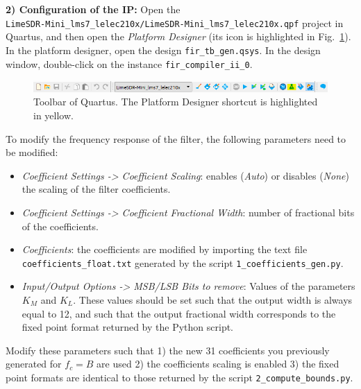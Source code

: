 \textbf{2) Configuration of the IP:}
Open the \\ \texttt{LimeSDR-Mini\_lms7\_lelec210x/LimeSDR-Mini\_lms7\_lelec210x.qpf} project in Quartus, and then open the \textit{Platform Designer} (its icon is highlighted in Fig.~\ref{fig:quartus}). In the platform designer, open the design \texttt{fir\_tb\_gen.qsys}. In the design window, double-click on the instance \texttt{fir\_compiler\_ii\_0}.

\begin{figure}[H]
    \centering
    \includegraphics[scale=0.7]{figures/quartus_toolbar.PNG}
    \caption{Toolbar of Quartus. The Platform Designer shortcut is highlighted in yellow.}
    \label{fig:quartus}
\end{figure}

To modify the frequency response of the filter, the following parameters need to be modified:
\begin{itemize}
    \item \textit{Coefficient Settings -> Coefficient Scaling}: enables (\textit{Auto}) or disables (\textit{None}) the scaling of the filter coefficients.
    \item \textit{Coefficient Settings -> Coefficient Fractional Width}: number of fractional bits of the coefficients.
    \item \textit{Coefficients}: the coefficients are modified by importing the text file \texttt{coefficients\_float.txt} generated by the script \texttt{1\_coefficients\_gen.py}.
    \item \textit{Input/Output Options -> MSB/LSB Bits to remove}: Values of the parameters $K_M$ and $K_L$. These values should be set such that the output width is always equal to 12, and such that the output fractional width corresponds to the fixed point format returned by the Python script.
\end{itemize}

Modify these parameters such that 1) the new 31 coefficients you previously generated for $f_c = B$ are used 2) the coefficients scaling is enabled 3) the fixed point formats are identical to those returned by the script \texttt{2\_compute\_bounds.py}.

